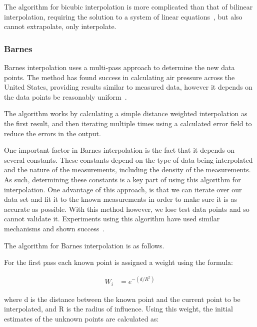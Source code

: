             The algorithm for bicubic interpolation is more complicated than that of bilinear interpolation, requiring the solution to a system of linear equations~\cite{bicubicorigins}, but also cannot extrapolate, only interpolate. 

        \subsubsection{Barnes}\label{background_interpolation_methods_barnes}

            Barnes interpolation uses a multi-pass approach to determine the new data points. The method has found success in calculating air pressure across the United States, providing results similar to measured data, however it depends on the data points be reasonably uniform~\cite{barnesinterpolation}.

            The algorithm works by calculating a simple distance weighted interpolation as the first result, and then iterating multiple times using a calculated error field to reduce the errors in the output. 

            One important factor in Barnes interpolation is the fact that it depends on several constants. These constants depend on the type of data being interpolated and the nature of the measurements, including the density of the measurements. As such, determining these constants is a key part of using this algorithm for interpolation. One advantage of this approach, is that we can iterate over our data set and fit it to the known measurements in order to make sure it is as accurate as possible. With this method however, we lose test data points and so cannot validate it. Experiments using this algorithm have used similar mechanisms and shown success~\cite{pmconcentrationmaps}.

            The algorithm for Barnes interpolation is as follows.

            For the first pass each known point is assigned a weight using the formula: 

            \begin{align*}
                W_{i} &= e^{-(d/R^{2})}
            \end{align*}
            
            where d is the distance between the known point and the current point to be interpolated, and R is the radius of influence. Using this weight, the initial estimates of the unknown points are calculated as: 
            
